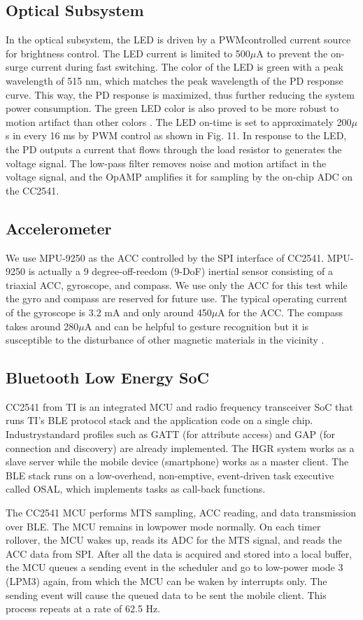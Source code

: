 \subsection{Optical Subsystem}
In the optical subsystem, the LED is driven by a PWMcontrolled
current source \cite{c22} for brightness control. The
LED current is limited to 500$\mu$A to prevent the on-surge
current during fast switching. The color of the LED is green
with a peak wavelength of 515 nm, which matches the peak
wavelength of the PD response curve. This way, the PD
response is maximized, thus further reducing the system power
consumption. The green LED color is also proved to be more
robust to motion artifact than other colors \cite{c23}. The LED
on-time is set to approximately 200$\mu$s in every 16 ms by
PWM control as shown in Fig. 11. In response to the LED,
the PD outputs a current that flows through the load resistor
to generates the voltage signal. The low-pass filter removes
noise and motion artifact in the voltage signal, and the OpAMP
amplifies it for sampling by the on-chip ADC on the CC2541.

\subsection{Accelerometer}
We use MPU-9250 \cite{c24} as the ACC controlled by the SPI
interface of CC2541. MPU-9250 is actually a 9 degree-off-reedom
(9-DoF) inertial sensor consisting of a triaxial ACC,
gyroscope, and compass. We use only the ACC for this test
while the gyro and compass are reserved for future use. The
typical operating current of the gyroscope is 3.2 mA and
only around 450$\mu$A for the ACC. The compass takes around
280$\mu$A and can be helpful to gesture recognition but it is
susceptible to the disturbance of other magnetic materials in
the vicinity \cite{c25}.


\subsection{Bluetooth Low Energy SoC}
CC2541 from TI is an integrated MCU and radio frequency
transceiver SoC that runs TI’s BLE protocol stack
\cite{c26} and the application code on a single chip. Industrystandard
profiles such as GATT (for attribute access) and GAP
(for connection and discovery) are already implemented. The
HGR system works as a slave server while the mobile device
(smartphone) works as a master client. The BLE stack runs
on a low-overhead, non-emptive, event-driven task executive
called OSAL, which implements tasks as call-back functions.

The CC2541 MCU performs MTS sampling, ACC reading,
and data transmission over BLE. The MCU remains in lowpower
mode normally. On each timer rollover, the MCU wakes
up, reads its ADC for the MTS signal, and reads the ACC data
from SPI. After all the data is acquired and stored into a local
buffer, the MCU queues a sending event in the scheduler and
go to low-power mode 3 (LPM3) again, from which the MCU
can be waken by interrupts only. The sending event will cause
the queued data to be sent the mobile client. This process
repeats at a rate of 62.5 Hz.